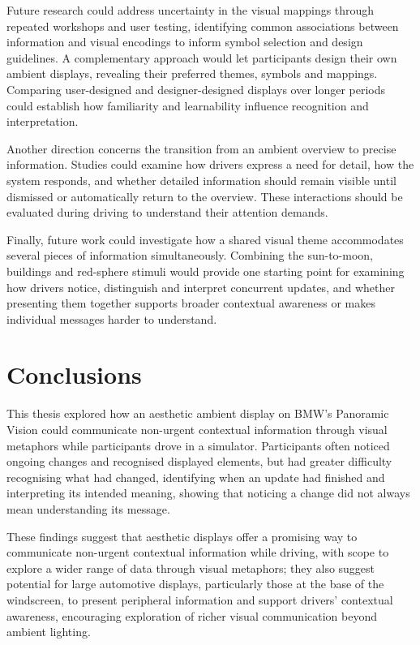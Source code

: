 \documentclass[
english,                 %
bibtex,                  %
includeExtraAbstracts, %
]{kththesis}
\numberwithin{listing}{chapter}
\begin{document}
Future research could address uncertainty in the visual mappings through repeated workshops and user testing, identifying common associations between information and visual encodings to inform symbol selection and design guidelines. A complementary approach would let participants design their own ambient displays, revealing their preferred themes, symbols and mappings. Comparing user-designed and designer-designed displays over longer periods could establish how familiarity and learnability influence recognition and interpretation.

Another direction concerns the transition from an ambient overview to precise information. Studies could examine how drivers express a need for detail, how the system responds, and whether detailed information should remain visible until dismissed or automatically return to the overview. These interactions should be evaluated during driving to understand their attention demands.

Finally, future work could investigate how a shared visual theme accommodates several pieces of information simultaneously. Combining the sun-to-moon, buildings and red-sphere stimuli would provide one starting point for examining how drivers notice, distinguish and interpret concurrent updates, and whether presenting them together supports broader contextual awareness or makes individual messages harder to understand.

\chapter{Conclusions}
\label{ch:conclusions}

This thesis explored how an aesthetic ambient display on BMW’s Panoramic Vision could communicate non-urgent contextual information through visual metaphors while participants drove in a simulator. Participants often noticed ongoing changes and recognised displayed elements, but had greater difficulty recognising what had changed, identifying when an update had finished and interpreting its intended meaning, showing that noticing a change did not always mean understanding its message.

These findings suggest that aesthetic displays offer a promising way to communicate non-urgent contextual information while driving, with scope to explore a wider range of data through visual metaphors; they also suggest potential for large automotive displays, particularly those at the base of the windscreen, to present peripheral information and support drivers’ contextual awareness, encouraging exploration of richer visual communication beyond ambient lighting.
\end{document}
